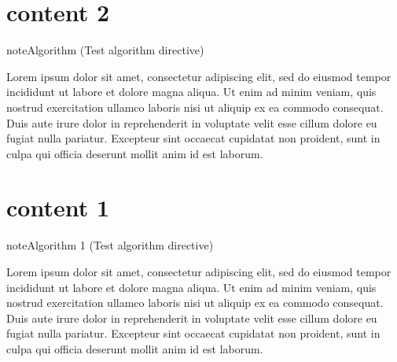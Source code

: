 

\pagestyle{empty}
\sphinxmaketitle
\pagestyle{plain}
\sphinxtableofcontents
\pagestyle{normal}
\label{\detokenize{index::doc}}


\sphinxstepscope


\chapter{content 2}
\label{\detokenize{algorithm/_algo_nonumber:content-2}}\label{\detokenize{algorithm/_algo_nonumber::doc}}\label{algorithm/_algo_nonumber:algorithm-0}
\begin{sphinxadmonition}{note}{Algorithm (Test algorithm directive)}



\sphinxAtStartPar
Lorem ipsum dolor sit amet, consectetur adipiscing elit, sed do eiusmod tempor incididunt ut labore et dolore magna aliqua. Ut enim ad minim veniam, quis nostrud exercitation ullamco laboris nisi ut aliquip ex ea commodo consequat. Duis aute irure dolor in reprehenderit in voluptate velit esse cillum dolore eu fugiat nulla pariatur. Excepteur sint occaecat cupidatat non proident, sunt in culpa qui officia deserunt mollit anim id est laborum.
\end{sphinxadmonition}

\sphinxstepscope


\chapter{content 1}
\label{\detokenize{algorithm/_algo_labeled_titled_with_classname:content-1}}\label{\detokenize{algorithm/_algo_labeled_titled_with_classname::doc}}\label{algorithm/_algo_labeled_titled_with_classname:test-algo-label}
\begin{sphinxadmonition}{note}{Algorithm 1 (Test algorithm directive)}



\sphinxAtStartPar
Lorem ipsum dolor sit amet, consectetur adipiscing elit, sed do eiusmod tempor incididunt ut labore et dolore magna aliqua. Ut enim ad minim veniam, quis nostrud exercitation ullamco laboris nisi ut aliquip ex ea commodo consequat. Duis aute irure dolor in reprehenderit in voluptate velit esse cillum dolore eu fugiat nulla pariatur. Excepteur sint occaecat cupidatat non proident, sunt in culpa qui officia deserunt mollit anim id est laborum.
\end{sphinxadmonition}

\sphinxstepscope


